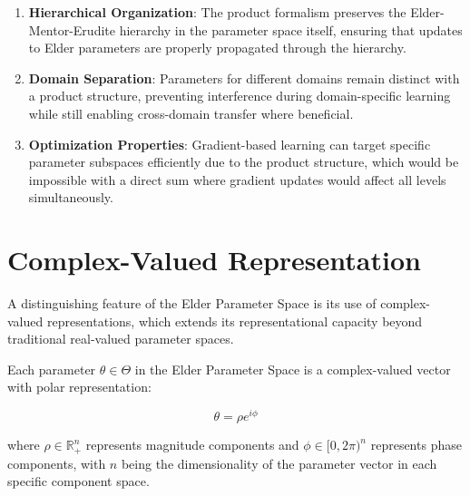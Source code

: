 \begin{definition}
\begin{enumerate}
    \item \textbf{Hierarchical Organization}: The product formalism preserves the Elder-Mentor-Erudite hierarchy in the parameter space itself, ensuring that updates to Elder parameters are properly propagated through the hierarchy.
    
    \item \textbf{Domain Separation}: Parameters for different domains remain distinct with a product structure, preventing interference during domain-specific learning while still enabling cross-domain transfer where beneficial.
    
    \item \textbf{Optimization Properties}: Gradient-based learning can target specific parameter subspaces efficiently due to the product structure, which would be impossible with a direct sum where gradient updates would affect all levels simultaneously.
\end{enumerate}
\end{definition}

\section{Complex-Valued Representation}

A distinguishing feature of the Elder Parameter Space is its use of complex-valued representations, which extends its representational capacity beyond traditional real-valued parameter spaces.

\begin{definition}
Each parameter $\theta \in \Theta$ in the Elder Parameter Space is a complex-valued vector with polar representation:

\begin{equation}
\theta = \rho e^{i\phi}
\end{equation}

where $\rho \in \mathbb{R}^n_+$ represents magnitude components and $\phi \in [0, 2\pi)^n$ represents phase components, with $n$ being the dimensionality of the parameter vector in each specific component space.
\end{definition}

